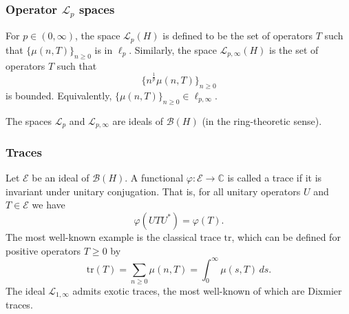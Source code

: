 \documentclass{beamer} %
\theoremstyle{definition} %
\newcommand{\Cplx}{\mathbb{C}}
\newcommand{\Lc}{\mathcal{L}}
\newcommand{\tr}{\mathrm{tr}}
\begin{document}
\begin{frame}\frametitle{Operator $\mathcal{L}_p$ spaces}
    For $p \in (0,\infty)$, the space $\mathcal{L}_p(H)$ is defined to be the set of operators $T$ such that $\{\mu(n,T)\}_{n\geq 0}$
    is in $\ell_p$. Similarly, the space $\mathcal{L}_{p,\infty}(H)$ is the set of operators $T$ such that
    \begin{equation*}
        \{n^{\frac{1}{p}}\mu(n,T)\}_{n\geq 0}
    \end{equation*}
    is bounded. Equivalently, $\{\mu(n,T)\}_{n\geq 0} \in \ell_{p,\infty}$.
    
    The spaces $\mathcal{L}_p$ and $\mathcal{L}_{p,\infty}$ are ideals of $\mathcal{B}(H)$ (in the ring-theoretic sense).
\end{frame}

\begin{frame}\frametitle{Traces}
    Let $\mathcal{E}$ be an ideal of $\mathcal{B}(H)$. A functional $\varphi:\mathcal{E}\to \Cplx$ is called a trace if it is invariant under unitary conjugation. That is,
    for all unitary operators $U$ and $T \in \mathcal{E}$ we have
    \begin{equation*}
        \varphi(UTU^*) = \varphi(T).
    \end{equation*}
    The most well-known example is the classical trace $\tr$, which can be defined for positive operators $T \geq 0$ by
    \begin{equation*}
        \tr(T) = \sum_{n\geq 0} \mu(n,T) = \int_{0}^\infty \mu(s,T)\,ds.
    \end{equation*}
    The ideal $\Lc_{1,\infty}$ admits exotic traces, the most well-known of which are Dixmier traces.
\end{frame}

\end{document}

